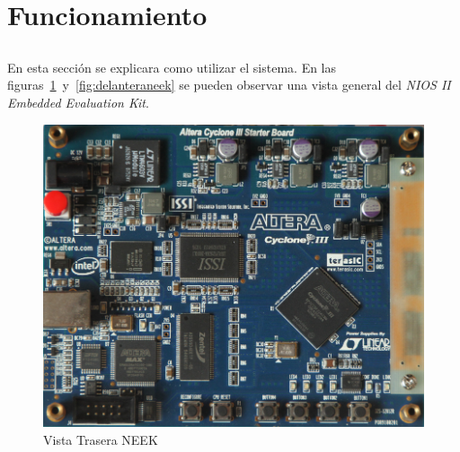 \documentclass[a4paper,12pt,titlepage,final]{book}
\begin{document}
\clearpage
\section{Funcionamiento}
\subsection*{}
\subsubsection*{}
\paragraph{}
En esta sección se explicara como utilizar el sistema. En las figuras~\ref{fig:traseraneek}~y~\ref{fig:delanteraneek} se pueden observar una vista general del \textit{NIOS II Embedded Evaluation Kit}.

\begin{figure}[p]
\centering
\includegraphics[width=\textwidth]{./figuras/NEEK/Trasera.png}
\caption{Vista Trasera NEEK}
\label{fig:traseraneek}
\end{figure}
\end{document}
